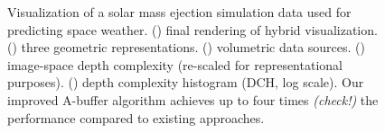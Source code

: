 \documentclass{egpubl}
\newcommand{\todo}[1]{{\color{red}\emph{(#1)}}}
\newcommand{\ab}{\mbox{A-buffer}}
\newlength{\boxheight}
\begin{document}
\begin{figure}[p]
\begin{minipage}[b][\boxheight][b]{0.24\linewidth}
\begin{minipage}[b]{0.98\linewidth}
    \end{minipage}%
  \end{minipage}%
  \caption{\label{fig:space}%
    Visualization of a solar mass ejection simulation data used for predicting space weather. 
    () final rendering of hybrid visualization.
    () three geometric representations.
    () volumetric data sources. %
    () image-space depth complexity (re-scaled for representational purposes). 
    () depth complexity histogram (DCH, log scale).
    Our improved \ab{} algorithm achieves up to four times \todo{check!} the performance compared to existing approaches.
  }
\end{figure}
\end{document}
